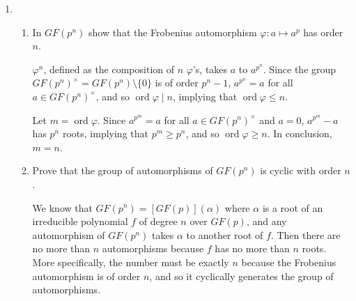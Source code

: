 \documentclass[12pt]{article}
\DeclareMathOperator{\ord}{ord}
\begin{document}
\begin{enumerate}
    \item
        \begin{enumerate}
            \item
                In $GF(p^n)$ show that the Frobenius automorphism $\varphi: a \mapsto a^p$ has order $n$. \par
                $\varphi^n$, defined as the composition of $n$ $\varphi$'s, takes $a$ to $a^{p^n}$. Since the group $GF(p^n)^\times = GF(p^n) \setminus \{0\}$ is of order $p^n - 1$, $a^{p^n} = a$ for all $a \in GF(p^n)^\times$, %
                and so $\ord{\varphi} \mid n$, implying that $\ord{\varphi} \leq n$. \par
                Let $m = \ord{\varphi}$. Since $a^{p^m} = a$ for all $a \in GF(p^n)^\times$ and $a = 0$, $a^{p^m} - a$ has $p^n$ roots, implying that $p^m \geq p^n$, and so $\ord{\varphi} \geq n$. In conclusion, $m = n$.
            \item
                Prove that the group of automorphisms of $GF(p^n)$ is cyclic with order $n$. \par
                We know that $GF(p^n) = [GF(p)](\alpha)$ where $\alpha$ is a root of an irreducible polynomial $f$ of degree $n$ over $GF(p)$, and any automorphism of $GF(p^n)$ takes $\alpha$ to another root of $f$. Then there are no more than $n$ automorphisms because $f$ has no more than $n$ roots. More specifically, the number must be exactly $n$ because the Frobenius automorphism is of order $n$, and so it cyclically generates the group of automorphisms.
        \end{enumerate}


\end{enumerate}
\end{document}
